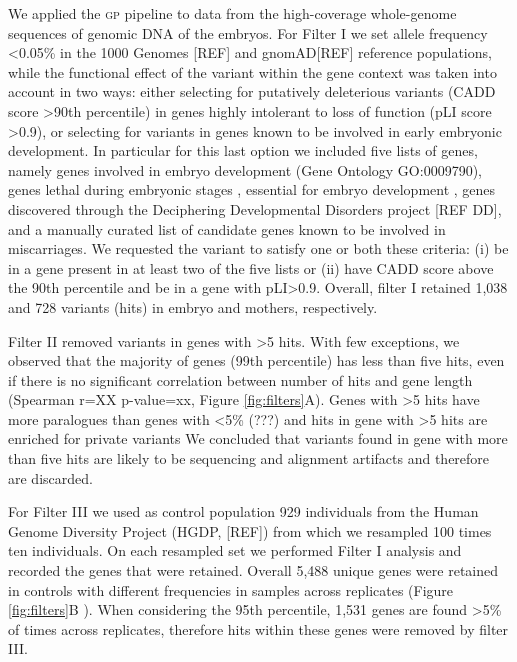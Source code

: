 \documentclass[fleqn,10pt]{wlscirep}
\newcommand{\gp}[]{\textsc{gp }}
\begin{document}
We applied the \gp pipeline to data from the high-coverage whole-genome sequences of genomic DNA of the embryos. For Filter I we set allele frequency <0.05\% in the 1000 Genomes [REF] and gnomAD[REF] reference populations, while the functional effect of the variant within the gene context was taken into account in two ways: either selecting for putatively deleterious variants (CADD score >90th percentile) in genes highly intolerant to loss of function (pLI score >0.9), or selecting for variants in genes known to be involved in early embryonic development. In particular for this last option we included five lists of genes, namely genes involved in embryo development (Gene Ontology GO:0009790), genes lethal during embryonic stages \cite{dawes2019gene}, essential for embryo development \cite{dawes2019gene}, genes discovered through the Deciphering Developmental Disorders project [REF DD], and a manually curated list of candidate genes known to be involved in miscarriages. We requested the variant to satisfy one or both these criteria: (i) be in a gene present in at least two of the five lists or (ii) have CADD score above the 90th percentile and be in a gene with pLI>0.9. Overall, filter I retained 1,038 and 728 variants (hits) in embryo and mothers, respectively.   

Filter II removed variants in genes with >5 hits. With few exceptions, we observed that the majority of genes (99th percentile) has less than five hits, even if there is no significant correlation between number of hits and gene length (Spearman r=XX p-value=xx, Figure \ref{fig:filters}A). Genes with >5 hits have more paralogues than genes with <5\% (???) and hits in gene with >5 hits are enriched for private variants  We concluded that variants found in gene with more than five hits are likely to be sequencing and alignment artifacts and therefore are discarded. 

For Filter III we used as control population 929 individuals from the Human Genome Diversity Project (HGDP, [REF]) from which we resampled 100 times ten individuals. On each resampled set we performed Filter I analysis and recorded the genes that were retained. Overall 5,488 unique genes were retained in controls with different frequencies in samples across replicates (Figure \ref{fig:filters}B ). When considering the 95th percentile, 1,531 genes are found >5\% of times across replicates, therefore hits within these genes were removed by filter III. %
\end{document}
